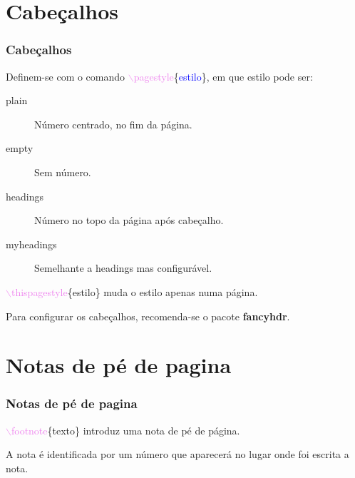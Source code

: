 \documentclass{beamer}
\begin{document}
\section{Cabeçalhos}
\begin{frame}
\frametitle{Cabeçalhos}
Definem-se com o comando
\textcolor{violet}{$\backslash$pagestyle}\{\textcolor{blue}{estilo}\},
em que estilo pode ser:\pause
\begin{description}
\item[\phantom{xxxxoiii}plain] Número centrado, no fim da página.\pause
\item[\phantom{xxxxii}empty] Sem número.\pause
\item[\phantom{xxi}headings] Número no topo da página após cabeçalho.\pause
\item[myheadings] Semelhante a headings mas configurável.\pause
\end{description}

\textcolor{violet}{$\backslash$thispagestyle}\{estilo\} muda o estilo apenas
numa página.\pause

Para configurar os cabeçalhos, recomenda-se o pacote \textbf{fancyhdr}.
\end{frame}
\section{Notas de pé de pagina}
\begin{frame}
\frametitle{Notas de pé de pagina}
\textcolor{violet}{$\backslash$footnote}\{texto\} introduz uma nota de pé de
página.\pause

A nota é identificada por um número que aparecerá no lugar onde foi escrita a
nota. 
\end{frame}
\end{document}
